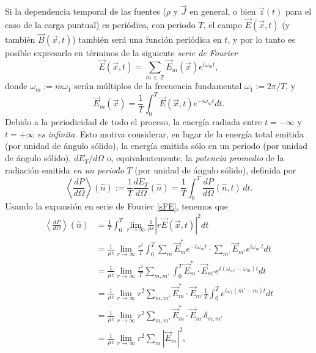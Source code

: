 Si la dependencia temporal de las fuentes ($\rho$ y $\vec{J}$ en general, o bien $\vec{z}(t)$ para el caso de la carga puntual) es periódica, con periodo $T$, el campo $\vec{E}(\vec{x},t)$ (y también $\vec{B}(\vec{x},t)$) también será una función periódica en $t$, y por lo tanto es posible expresarlo en términos de la siguiente \textit{serie de Fourier}
\begin{equation}\label{sFE}
\vec{E}(\vec{x},t) =\sum_{m\,\in\, \mathbb{Z}} \vec{E}_{m}(\vec{x})e^{i\omega_{m}t},
\end{equation}
donde $\omega_{m}:=m\omega_1$ serán múltiplos de la frecuencia
fundamental $\omega_1:={2\pi}/{T}$, y
\begin{equation}
\vec{E}_{m}(\vec{x}) =\frac{1}{T}\int_0^{T}\vec{E}(\vec{x},t) e^{-i\omega_{m}t}dt. \label{defAm}
\end{equation}
Debido a la periodicidad de todo el proceso, la energía radiada entre $t=-\infty$ y $t=+\infty$ \textit{es infinita}. Esto motiva considerar, en lugar de la energía  total emitida (por unidad de ángulo sólido), la energía emitida sólo en un periodo (por unidad de ángulo sólido), $dE_T/d\Omega$ o, equivalentemente, la \textit{potencia promedio} de la radiación emitida \textit{en un periodo} $T$ (por unidad de ángulo sólido), definida por
\begin{equation}
\left\langle \frac{dP}{d\Omega}\right\rangle (\hat{n}) :=\frac{1}{T}\frac{dE_T}{d\Omega}(\hat{n})=\frac{1}{T}\int_0^{T}\frac{dP}{d\Omega}(\hat{n},t)\,dt.
\end{equation}
Usando la expansión en serie de Fourier \eqref{sFE}, tenemos que
\begin{align}
\left\langle \frac{dP}{d\Omega}\right\rangle (\hat{n})&
=\frac{1}{T}\int_0^{T}\lim_{r\to\infty}\frac{1}{\mu c}\left|r \vec{E}(\vec{x},t)\right|^2dt\\
&  =\frac{1}{\mu c}\lim_{r\to\infty}\frac{r^2}{T}\int_0^{T}\sum_{m}\vec{E}_{m}^*e^{-i\omega_{m}t}\cdot\sum_{m'}\vec{E}_{m'}e^{i\omega_{m'}t}dt\\
&  =\frac{1}{\mu c}\lim_{r\to\infty}\frac{r^2}{T}\sum_{m,m' }\int_0^{T}\vec{E}_{m}^*\cdot\vec{E}_{m'}e^{i\left(\omega_{m'}-\omega_{m}\right)  t}dt\\
&  =\frac{1}{\mu c}\lim_{r\to\infty}r^2 \sum_{m,m'}\vec{E}_{m}^*\cdot\vec{E}_{m'}\frac{1}{T}
\int_0^{T}e^{i\omega_1\left(m'-m\right)  t}dt\\
&  =\frac{1}{\mu c}\lim_{r\to\infty}r^2\sum_{m,m' }\vec{E}_{m}^*\cdot\vec{E}_{m' }\delta_{m,m'}\\
&  =\frac{1}{\mu c}\lim_{r\to\infty}r^2\sum_{m}\left|\vec{E}_{m}\right|^2,
\end{align}

